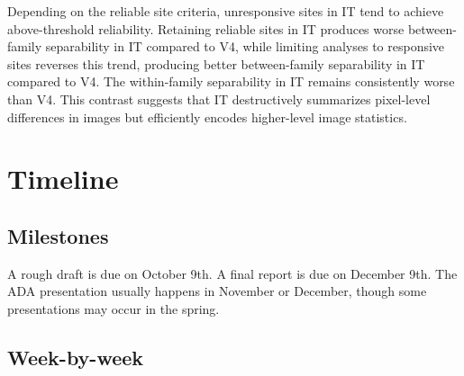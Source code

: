 \documentclass[
  11pt,
  letterpaper,
  DIV=11,
  numbers=noendperiod]{scrartcl}
\begin{document}
Depending on the reliable site criteria, unresponsive sites in IT tend
to achieve above-threshold reliability. Retaining reliable sites in IT
produces worse between-family separability in IT compared to V4, while
limiting analyses to responsive sites reverses this trend, producing
better between-family separability in IT compared to V4. The
within-family separability in IT remains consistently worse than V4.
This contrast suggests that IT destructively summarizes pixel-level
differences in images but efficiently encodes higher-level image
statistics.

\pagebreak

\section{Timeline}\label{timeline}

\subsection{Milestones}\label{milestones}

A rough draft is due on October 9th. A final report is due on December
9th. The ADA presentation usually happens in November or December,
though some presentations may occur in the spring.

\subsection{Week-by-week}\label{week-by-week}
\end{document}
